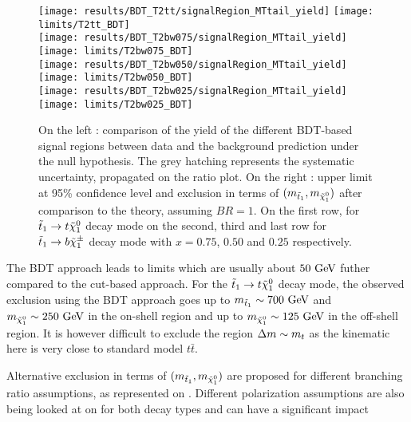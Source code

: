     \begin{figure}[h!]
        \centering
        \texttt{[image: results/BDT\_T2tt/signalRegion\_MTtail\_yield]}
        \texttt{[image: limits/T2tt\_BDT]}\\
        \texttt{[image: results/BDT\_T2bw075/signalRegion\_MTtail\_yield]}
        \texttt{[image: limits/T2bw075\_BDT]}\\
        \texttt{[image: results/BDT\_T2bw050/signalRegion\_MTtail\_yield]}
        \texttt{[image: limits/T2bw050\_BDT]}\\
        \texttt{[image: results/BDT\_T2bw025/signalRegion\_MTtail\_yield]}
        \texttt{[image: limits/T2bw025\_BDT]}\\
        \caption{On the left : comparison of the yield of the different BDT-based signal
        regions between data and the background prediction under the null hypothesis. The
        grey hatching represents the systematic uncertainty, propagated on the ratio plot.
        On the right : upper limit at 95\% confidence level and exclusion in terms of
        $(m_{\tilde{t}_1},m_{\tilde{\chi}_1^0})$ after comparison to the theory, assuming
        $BR = 1$. On the first row, for $\tilde{t}_1 \rightarrow t \tilde{\chi}_1^0$ decay mode on
        the second, third and last row for $\tilde{t}_1 \rightarrow b \tilde{\chi}_1^\pm$ decay mode
        with $x=0.75$, $0.50$ and $0.25$ respectively.}
        \label{fig:resultsBDT}
    \end{figure}

    The BDT approach leads to limits which are usually about $50 ~\text{GeV}$ futher compared to
    the cut-based approach. For the $\tilde{t}_1 \rightarrow t \tilde{\chi}_1^0$ decay mode, the
    observed exclusion using the BDT approach goes up to $m_{\tilde{t}_1} \sim 700 ~\text{GeV}$
    and $m_{\tilde{\chi}_1^0} \sim 250 ~\text{GeV}$ in the on-shell region and up to
    $m_{\tilde{\chi}_1^0} \sim 125 ~\text{GeV}$ in the off-shell region. It is however difficult
    to exclude the region $\Delta m \sim m_{t}$ as the kinematic here is very close to
    standard model $t\bar{t}$.


    Alternative exclusion in terms of $(m_{\tilde{t}_1}, m_{\tilde{\chi}_1^0})$ are proposed
    for different branching ratio assumptions, as represented on .
    Different polarization assumptions are also being looked at on  for both
    decay types and can have a significant impact


